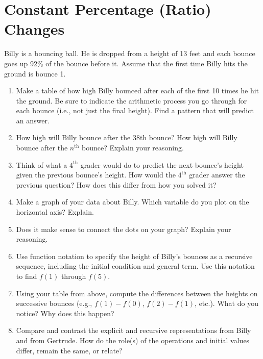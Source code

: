 \documentclass[justified,openany,nofonts]{tufte-book}
\begin{document}
\newpage
\section{Constant Percentage (Ratio) Changes}\label{A:ConstantRatio}

\begin{prob}
Billy is a bouncing ball.  He is dropped from a height of 13 feet and each bounce goes up 92\% of the bounce before it.  Assume that the first time Billy hits the ground is bounce 1.  

\begin{enumerate}
\item Make a table of how high Billy bounced after each of the first 10 times he hit the ground.  Be sure to indicate the arithmetic process you go through for each bounce (i.e., not just the final height).  Find a pattern that will predict an answer.  

\item How high will Billy bounce after the 38th bounce?  How high will Billy bounce after the $n^\mathrm{th}$ bounce?  Explain your reasoning. 

\item Think of what a $4^\mathrm{th}$ grader would do to predict the next bounce's height given the previous bounce's height.  How would the $4^\mathrm{th}$ grader answer the previous question?  How does this differ from how you solved it?

\item Make a graph of your data about Billy.  Which variable do you plot on the horizontal axis?  Explain.  
\item Does it make sense to connect the dots on your graph?  Explain your reasoning.  

\item  Use function notation to specify the height of Billy's bounces as a recursive sequence, including the initial condition and general term.   Use this notation to find $f(1)$ through $f(5)$.

\item Using your table from above, compute the differences between the heights on successive bounces (e.g.,  $f(1) - f(0)$, $f(2) - f(1)$, etc.).  What do you notice?  Why does this happen?

\item Compare and contrast the explicit and recursive representations from Billy and from Gertrude.  How do the role(s) of the operations and initial values differ, remain the same, or relate?
\end{enumerate}
\end{prob}
\end{document}
